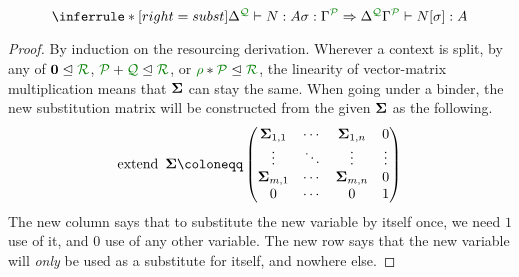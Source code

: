 \begin{lemma}[Substitution]
  \[
    \inferrule*[right=subst]{
      \ctx{\Delta}{Q} \vdash N : A
      \\ \sigma : \ctx{\Gamma}{P} \Rightarrow \ctx{\Delta}{Q}
    }
    {
      \ctx{\Gamma}{P} \vdash N[\sigma] : A
    }
  \]
\end{lemma}
\renewcommand{\proofname}{Proof sketch}
\begin{proof}
  By induction on the resourcing derivation.
  Wherever a context is split, by any of $\vct 0 \subres \resctx R$,
  $\resctx P + \resctx Q \subres \resctx R$, or
  $\rescomment \rho * \resctx P \subres \resctx R$, the linearity of vector-matrix
  multiplication means that $\mathbf{\Sigma}$ can stay the same.
  When going under a binder, the new substitution matrix will be constructed
  from the given $\mathbf{\Sigma}$ as the following.
  \newcommand*{\mathhuge}[1]{\mathlarger{\mathlarger{\mathlarger{\mathlarger{#1}}}}}
  \[
    \operatorname{extend}~\mat \Sigma \coloneqq
    \begin{pmatrix}
      \mat \Sigma_{1,1} & \cdots & \mat \Sigma_{1,n} & 0 \\
      \vdots & \ddots & \vdots & \vdots \\
      \mat \Sigma_{m,1} & \cdots & \mat \Sigma_{m,n} & 0 \\
      0 & \cdots & 0 & 1
    \end{pmatrix}
  \]
  The new column says that to substitute the new variable by itself once, we
  need $1$ use of it, and $0$ use of any other variable.
  The new row says that the new variable will \emph{only} be used as a
  substitute for itself, and nowhere else.
\end{proof}
\renewcommand{\proofname}{Proof}

